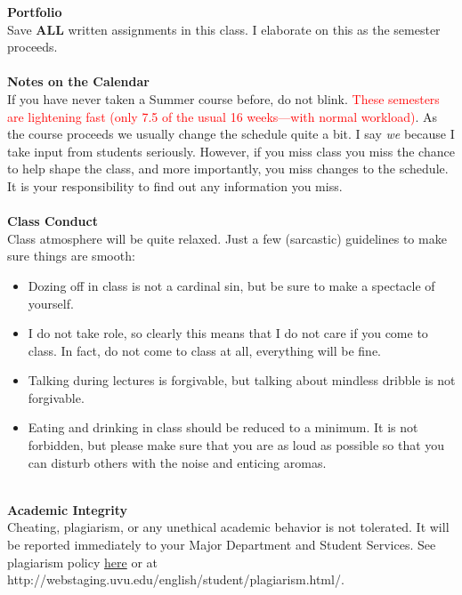 \documentclass [11pt]{article}
\begin{document}
 {\bf Portfolio}\\
   Save {\bf ALL} written assignments in this class. I elaborate on this as the semester proceeds. \\
   \ \\ 

   {\bf Notes on the Calendar}\\
   If you have never taken a Summer course before, do not blink. \textcolor{red}{These semesters are lightening fast (only 7.5 of the usual 16 weeks---with normal workload)}. As the course proceeds we usually change the schedule quite a bit. I say {\it we} because I take input from students seriously. However, if you miss class you miss the chance to help shape the class, and more importantly, you miss changes to the schedule. It is your responsibility to find out any information you miss. \\
   \ \\  

   {\bf Class Conduct}\\
   Class atmosphere will be quite relaxed. Just a few (sarcastic) guidelines to make sure things are smooth:
   \begin{itemize}
   \item  Dozing off in class is not a cardinal sin, but be sure to make a spectacle of yourself.
   \item I do not take role, so clearly this means that I do not care if you come to class. In fact, do not come to class at all, everything will be fine.
    \item Talking during lectures is forgivable, but talking about mindless dribble is not forgivable.
     \item  Eating and drinking in class should be reduced to a minimum. It is not forbidden, but please make sure that you are as loud as possible so that you can disturb others with the noise and enticing aromas.
        
    \end{itemize}
   \ \\
       

   {\bf Academic Integrity}\\
 Cheating, plagiarism, or any unethical academic behavior is not tolerated. It will be reported immediately to your Major Department and Student Services. See plagiarism policy \href{http://webstaging.uvu.edu/english/student/plagiarism.html/}{here} or at http://webstaging.uvu.edu/english/student/plagiarism.html/.\\
   \ \\
  
\end{document}
